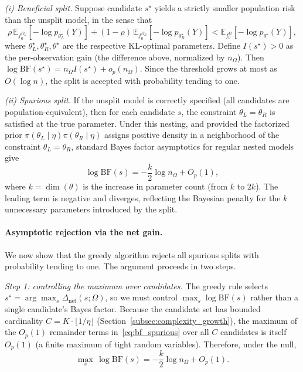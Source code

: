 \documentclass[twoside,11pt]{article}
\begin{document}
\emph{(i) Beneficial split.} Suppose candidate $s^\star$ yields a strictly smaller population risk than the unsplit model, in the sense that
\[
\rho\, \mathbb{E}_{f_0^{\Omega_L}}[-\log p_{\theta_L^\star}(Y)] + (1-\rho)\, \mathbb{E}_{f_0^{\Omega_R}}[-\log p_{\theta_R^\star}(Y)] < \mathbb{E}_{f_0^{\Omega}}[-\log p_{\theta^\star}(Y)],
\]
where $\theta_L^\star, \theta_R^\star, \theta^\star$ are the respective KL-optimal parameters. Define $I(s^\star) > 0$ as the per-observation gain (the difference above, normalized by $n_\Omega$). Then $\log \mathrm{BF}(s^\star) = n_\Omega I(s^\star) + o_p(n_\Omega)$. Since the threshold grows at most as $O(\log n)$, the split is accepted with probability tending to one.

\emph{(ii) Spurious split.} If the unsplit model is correctly specified (all candidates are population-equivalent), then for each candidate $s$, the constraint $\theta_L = \theta_R$ is satisfied at the true parameter. Under this nesting, and provided the factorized prior $\pi(\theta_L \mid \eta)\pi(\theta_R \mid \eta)$ assigns positive density in a neighborhood of the constraint $\theta_L = \theta_R$, standard Bayes factor asymptotics for regular nested models \citep{kass1995bayes} give
\begin{equation}\label{eq:bf_spurious}
\log \mathrm{BF}(s) = -\frac{k}{2}\log n_\Omega + O_p(1),
\end{equation}
where $k = \dim(\theta)$ is the increase in parameter count (from $k$ to $2k$). The leading term is negative and diverges, reflecting the Bayesian penalty for the $k$ unnecessary parameters introduced by the split.

\paragraph{Asymptotic rejection via the net gain.}
We now show that the greedy algorithm rejects all spurious splits with probability tending to one. The argument proceeds in two steps.

\emph{Step 1: controlling the maximum over candidates.}
The greedy rule selects $s^\star = \arg\max_s \Delta_{\mathrm{net}}(s;\Omega)$, so we must control $\max_s \log\mathrm{BF}(s)$ rather than a single candidate's Bayes factor. Because the candidate set has bounded cardinality $C = K \cdot \lfloor 1/\eta \rfloor$ (Section~\ref{subsec:complexity_growth}), the maximum of the $O_p(1)$ remainder terms in~\eqref{eq:bf_spurious} over all $C$ candidates is itself $O_p(1)$ (a finite maximum of tight random variables). Therefore, under the null,
\[
\max_{s}\, \log \mathrm{BF}(s) = -\frac{k}{2}\log n_\Omega + O_p(1).
\]
\end{document}
